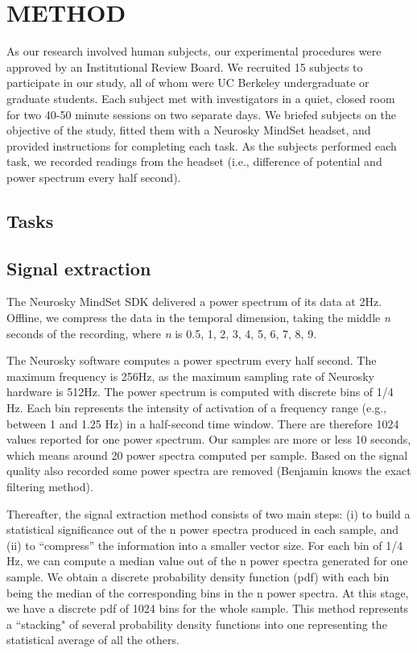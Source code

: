 \section{\uppercase{Method}}

As our research involved human subjects, our experimental procedures were approved by an Institutional Review Board. We recruited 15 subjects to participate in our study, all of whom were UC Berkeley undergraduate or graduate students. Each subject met with investigators in a quiet, closed room for two 40-50 minute sessions on two separate days. We briefed subjects on the objective of the study, fitted them with a Neurosky MindSet headset, and provided instructions for completing each task. As the subjects performed each task, we recorded readings from the headset (i.e., difference of potential and power spectrum every half second).

\subsection{Tasks}


\subsection{Signal extraction}

The Neurosky MindSet SDK delivered a power spectrum of its data at 2Hz. Offline, we compress the data in the temporal dimension, taking the middle \textit{n} seconds of the recording, where \textit{n} is {0.5, 1, 2, 3, 4, 5, 6, 7, 8, 9}. 

The Neurosky software computes a power spectrum every half second. The maximum frequency is 256Hz, as the maximum sampling rate of Neurosky hardware is 512Hz. The power spectrum is computed with discrete bins of 1/4 Hz. Each bin represents the intensity of activation of a frequency range (e.g., between 1 and 1.25 Hz) in a half-second time window. There are therefore 1024 values reported for one power spectrum. Our samples are more or less 10 seconds, which means around 20 power spectra computed per sample. Based on the signal quality also recorded some power spectra are removed (Benjamin knows the exact filtering method).

Thereafter, the signal extraction method consists of two main steps: (i) to build a statistical significance out of the n power spectra produced in each sample, and (ii) to ``compress'' the information into a smaller vector size. For each bin of 1/4 Hz, we can compute a median value out of the n power spectra generated for one sample.  We obtain a discrete probability density function (pdf) with each bin being the median of the corresponding bins in the n power spectra. At this stage, we have a discrete pdf of 1024 bins for the whole sample. This method represents a ``stacking" of several probability density functions into one representing the statistical average of all the others.


